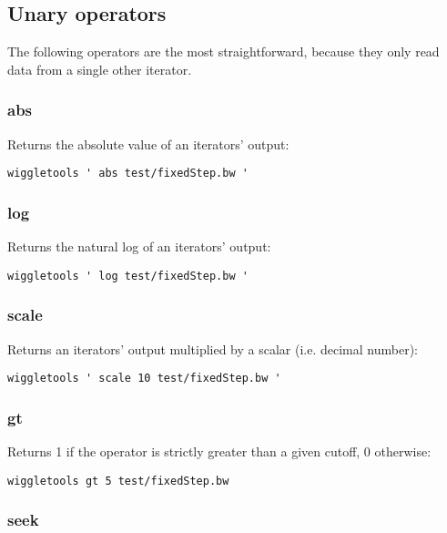 \documentclass[12pt]{article}
\begin{document}
\subsection{Unary operators}

The following operators are the most straightforward, because they only read data from a single other iterator.

\subsubsection{abs}

Returns the absolute value of an iterators' output:

\begin{verbatim}
wiggletools ' abs test/fixedStep.bw '
\end{verbatim}

\subsubsection{log}

Returns the natural log of an iterators' output:

\begin{verbatim}
wiggletools ' log test/fixedStep.bw '
\end{verbatim}

\subsubsection{scale}

Returns an iterators' output multiplied by a scalar (i.e. decimal number):

\begin{verbatim}
wiggletools ' scale 10 test/fixedStep.bw '
\end{verbatim}


\subsubsection{gt}

Returns 1 if the operator is strictly greater than a given cutoff, 0 otherwise:

\begin{verbatim}
wiggletools gt 5 test/fixedStep.bw 
\end{verbatim}

\subsubsection{seek}
\end{document}
